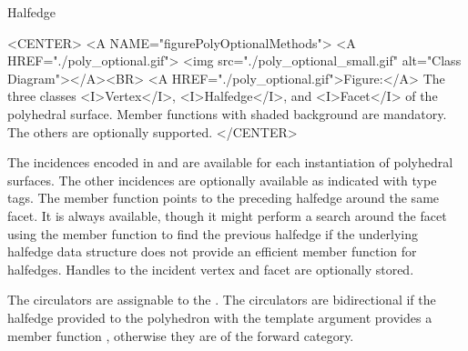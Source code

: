\begin{ccRefClass}{Halfedge}
\begin{ccHtmlOnly}
    <CENTER>
    <A NAME="figurePolyOptionalMethods">
    <A HREF="./poly_optional.gif">
        <img src="./poly_optional_small.gif" 
             alt="Class Diagram"></A><BR>
    <A HREF="./poly_optional.gif">Figure:</A>
    The three classes <I>Vertex</I>, <I>Halfedge</I>, and 
          <I>Facet</I> of the polyhedral surface. Member
          functions with shaded background are mandatory. The others
          are optionally supported.
    </CENTER>
\end{ccHtmlOnly}


The incidences encoded in  and  are
available for each instantiation of polyhedral surfaces.  The other
incidences are optionally available as indicated with type tags.  The
 member function points to the preceding halfedge around
the same facet. It is always available, though it might perform a
search around the facet using the  member function to find
the previous halfedge if the underlying halfedge data structure does
not provide an efficient  member function for halfedges.
Handles to the incident vertex and facet are optionally stored.

The circulators are assignable to the . The
circulators are bidirectional if the halfedge provided to the
polyhedron with the  template argument provides a member
function , otherwise they are of the forward category.



\vspace*{-1mm}
\ccTypes
{}
\ccThreeToTwo

\ccGlue
{}
\vspace*{-3mm}

\ccGlue
{}
\ccGlue
{}
\ccGlue
{}
\ccGlue
{}

\ccGlue
{}
\ccGlue
{}
\ccGlue
{}
\ccGlue
{}


\end{ccRefClass}
